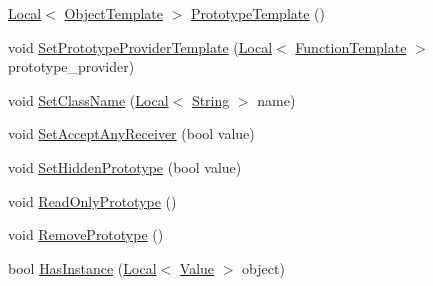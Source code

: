\begin{DoxyCompactItemize}
\mbox{\hyperlink{classv8_1_1Local}{Local}}$<$ \mbox{\hyperlink{classv8_1_1ObjectTemplate}{Object\+Template}} $>$ \mbox{\hyperlink{classv8_1_1FunctionTemplate_aa2bcc2652b5f0fdbc666d943ccf72021}{Prototype\+Template}} ()
\item 
void \mbox{\hyperlink{classv8_1_1FunctionTemplate_abbe5fd8e3688db6dfb3793f9a48aa372}{Set\+Prototype\+Provider\+Template}} (\mbox{\hyperlink{classv8_1_1Local}{Local}}$<$ \mbox{\hyperlink{classv8_1_1FunctionTemplate}{Function\+Template}} $>$ prototype\+\_\+provider)
\item 
void \mbox{\hyperlink{classv8_1_1FunctionTemplate_a491e77dc7ceb5b0fe75880d11f2dbe9e}{Set\+Class\+Name}} (\mbox{\hyperlink{classv8_1_1Local}{Local}}$<$ \mbox{\hyperlink{classv8_1_1String}{String}} $>$ name)
\item 
void \mbox{\hyperlink{classv8_1_1FunctionTemplate_a5ffdc68d8035b02ed7583950b76ef91f}{Set\+Accept\+Any\+Receiver}} (bool value)
\item 
void \mbox{\hyperlink{classv8_1_1FunctionTemplate_ade426e8a21d777ae6100e6c1aa7bfaee}{Set\+Hidden\+Prototype}} (bool value)
\item 
void \mbox{\hyperlink{classv8_1_1FunctionTemplate_a91d2e0643e8c5a53ab1d75f7766c2422}{Read\+Only\+Prototype}} ()
\item 
void \mbox{\hyperlink{classv8_1_1FunctionTemplate_a4a184aca244174c7fe52d58871d3129e}{Remove\+Prototype}} ()
\item 
bool \mbox{\hyperlink{classv8_1_1FunctionTemplate_a90d838f3456d300bd19d2a2cb98645bd}{Has\+Instance}} (\mbox{\hyperlink{classv8_1_1Local}{Local}}$<$ \mbox{\hyperlink{classv8_1_1Value}{Value}} $>$ object)
\end{DoxyCompactItemize}
